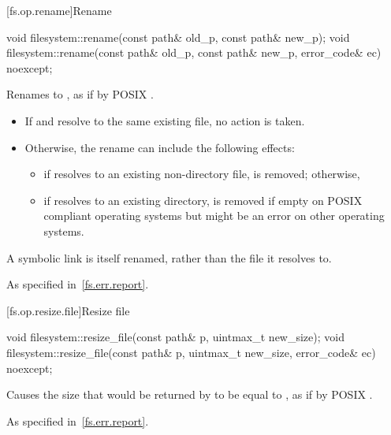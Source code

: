[fs.op.rename]{Rename}

%
\begin{itemdecl}
void filesystem::rename(const path& old_p, const path& new_p);
void filesystem::rename(const path& old_p, const path& new_p, error_code& ec) noexcept;
\end{itemdecl}

\begin{itemdescr}
\pnum
\effects
Renames  to , as if by
  POSIX .

\begin{note}
\begin{itemize}
\item If  and  resolve to the same existing file,
   no action is taken.
\item Otherwise, the rename can include the following effects:
\begin{itemize}
\item if  resolves to an existing non-directory file,
     is removed; otherwise,
\item if  resolves to an existing directory,
     is removed if empty on POSIX compliant operating systems
    but might be an error on other operating systems.
\end{itemize}
\end{itemize}
A symbolic link is itself renamed, rather than the file it resolves to.
\end{note}

\pnum
\throws
As specified in~\ref{fs.err.report}.
\end{itemdescr}


[fs.op.resize.file]{Resize file}

%
\begin{itemdecl}
void filesystem::resize_file(const path& p, uintmax_t new_size);
void filesystem::resize_file(const path& p, uintmax_t new_size, error_code& ec) noexcept;
\end{itemdecl}

\begin{itemdescr}
\pnum
\effects
Causes the size that would be returned by  to be
equal to , as if by POSIX .

\pnum
\throws
As specified in~\ref{fs.err.report}.
\end{itemdescr}


